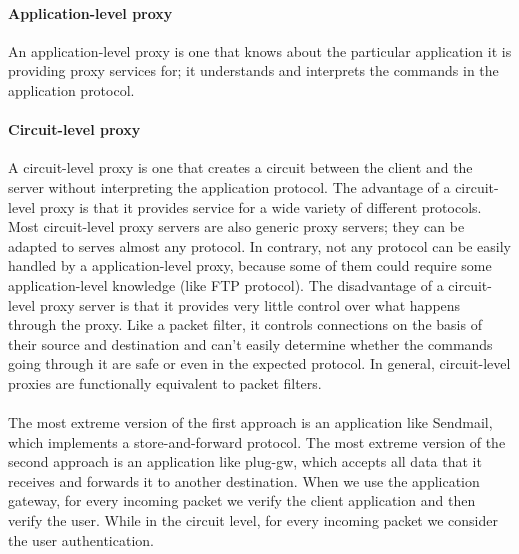 \documentclass[11pt]{article}
\begin{document}
\paragraph{Application-level proxy} An application-level proxy is one that knows about the particular application it is providing proxy services for; it understands and interprets the commands in the application protocol. 
\paragraph{Circuit-level proxy} A circuit-level proxy is one that creates a circuit between the client and the server without interpreting the application protocol. The advantage of a circuit-level proxy is that it provides service for a wide variety of different protocols. Most circuit-level proxy servers are also generic proxy servers; they can be adapted to serves almost any protocol. In contrary, not any protocol can be easily handled by a application-level proxy, because some of them could require some application-level knowledge (like FTP protocol). The disadvantage of a circuit-level proxy server is that it provides very little control over what happens through the proxy. Like a packet filter, it controls connections on the basis of their source and destination and can't easily determine whether the commands going through it are safe or even in the expected protocol. In general, circuit-level proxies are functionally equivalent to packet filters.\\\\The most extreme version of the first approach is an application like Sendmail, which implements a store-and-forward protocol. The most extreme version of the second approach is an application like plug-gw, which accepts all data that it receives and forwards it to another destination. When we use the application gateway, for every incoming packet we verify the client application and then verify the user. While in the circuit level, for every incoming packet we consider the user authentication.
\end{document}
